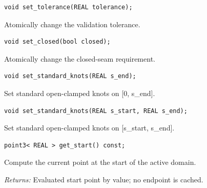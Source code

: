 \par\noindent\begin{minipage}{\linewidth}
\begin{lstlisting}[style=apireference]
void set_tolerance(REAL tolerance);
\end{lstlisting}
{\footnotesize Atomically change the validation tolerance.\par}
\end{minipage}\par\vspace{1pt}
\par\noindent\begin{minipage}{\linewidth}
\begin{lstlisting}[style=apireference]
void set_closed(bool closed);
\end{lstlisting}
{\footnotesize Atomically change the closed-seam requirement.\par}
\end{minipage}\par\vspace{1pt}
\par\noindent\begin{minipage}{\linewidth}
\begin{lstlisting}[style=apireference]
void set_standard_knots(REAL s_end);
\end{lstlisting}
{\footnotesize Set standard open-clamped knots on [0, s\_end].\par}
\end{minipage}\par\vspace{1pt}
\par\noindent\begin{minipage}{\linewidth}
\begin{lstlisting}[style=apireference]
void set_standard_knots(REAL s_start, REAL s_end);
\end{lstlisting}
{\footnotesize Set standard open-clamped knots on [s\_start, s\_end].\par}
\end{minipage}\par\vspace{1pt}
\par\noindent\begin{minipage}{\linewidth}
\begin{lstlisting}[style=apireference]
point3< REAL > get_start() const;
\end{lstlisting}
{\footnotesize Compute the current point at the start of the active domain.\par}
{\footnotesize\textit{Returns:} Evaluated start point by value; no endpoint is cached.\par}
\end{minipage}\par\vspace{1pt}
